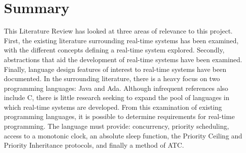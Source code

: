 \section{Summary}
This Literature Review has looked at three areas of relevance to this project.
First, the existing literature surrounding real-time systems has been examined,
with the different concepts defining a real-time system explored. Secondly,
abstractions that aid the development of real-time systems have been examined.
Finally, language design features of interest to real-time systems
have been documented. In the surrounding literature, there is a heavy focus on two
programming languages: Java and Ada. Although infrequent references also include C, 
there is little research seeking to expand the pool of languages in which 
real-time systems are developed. From this examination of existing programming 
languages, it is possible to determine requirements for real-time programming. 
The language must provide: concurrency, priority scheduling, access to a monotonic 
clock, an absolute sleep function, the Priority Ceiling and Priority Inheritance 
protocols, and finally a method of ATC. 
